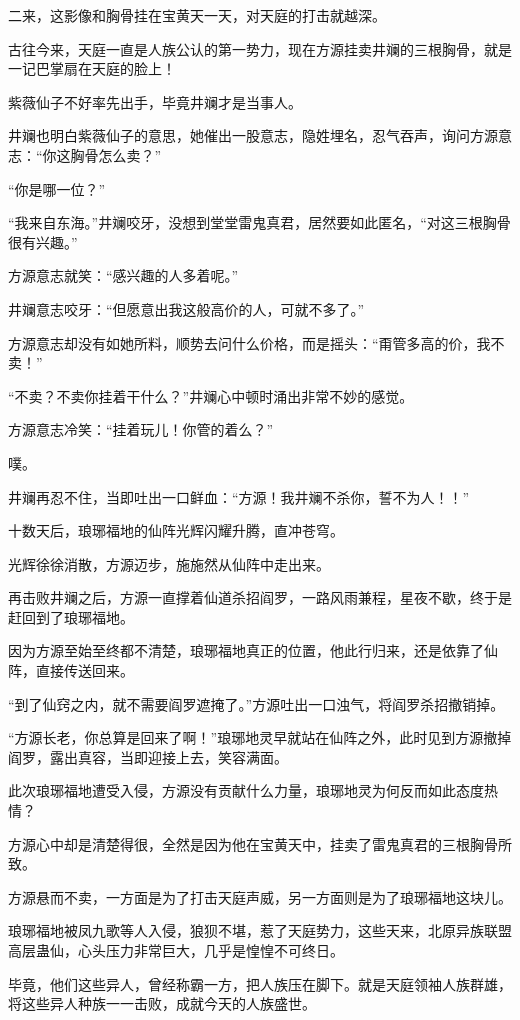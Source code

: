 \begin{this_body}
二来，这影像和胸骨挂在宝黄天一天，对天庭的打击就越深。

古往今来，天庭一直是人族公认的第一势力，现在方源挂卖井斓的三根胸骨，就是一记巴掌扇在天庭的脸上！

紫薇仙子不好率先出手，毕竟井斓才是当事人。

井斓也明白紫薇仙子的意思，她催出一股意志，隐姓埋名，忍气吞声，询问方源意志：“你这胸骨怎么卖？”

“你是哪一位？”

“我来自东海。”井斓咬牙，没想到堂堂雷鬼真君，居然要如此匿名，“对这三根胸骨很有兴趣。”

方源意志就笑：“感兴趣的人多着呢。”

井斓意志咬牙：“但愿意出我这般高价的人，可就不多了。”

方源意志却没有如她所料，顺势去问什么价格，而是摇头：“甭管多高的价，我不卖！”

“不卖？不卖你挂着干什么？”井斓心中顿时涌出非常不妙的感觉。

方源意志冷笑：“挂着玩儿！你管的着么？”

噗。

井斓再忍不住，当即吐出一口鲜血：“方源！我井斓不杀你，誓不为人！！”

十数天后，琅琊福地的仙阵光辉闪耀升腾，直冲苍穹。

光辉徐徐消散，方源迈步，施施然从仙阵中走出来。

再击败井斓之后，方源一直撑着仙道杀招阎罗，一路风雨兼程，星夜不歇，终于是赶回到了琅琊福地。

因为方源至始至终都不清楚，琅琊福地真正的位置，他此行归来，还是依靠了仙阵，直接传送回来。

“到了仙窍之内，就不需要阎罗遮掩了。”方源吐出一口浊气，将阎罗杀招撤销掉。

“方源长老，你总算是回来了啊！”琅琊地灵早就站在仙阵之外，此时见到方源撤掉阎罗，露出真容，当即迎接上去，笑容满面。

此次琅琊福地遭受入侵，方源没有贡献什么力量，琅琊地灵为何反而如此态度热情？

方源心中却是清楚得很，全然是因为他在宝黄天中，挂卖了雷鬼真君的三根胸骨所致。

方源悬而不卖，一方面是为了打击天庭声威，另一方面则是为了琅琊福地这块儿。

琅琊福地被凤九歌等人入侵，狼狈不堪，惹了天庭势力，这些天来，北原异族联盟高层蛊仙，心头压力非常巨大，几乎是惶惶不可终日。

毕竟，他们这些异人，曾经称霸一方，把人族压在脚下。就是天庭领袖人族群雄，将这些异人种族一一击败，成就今天的人族盛世。


\end{this_body}
